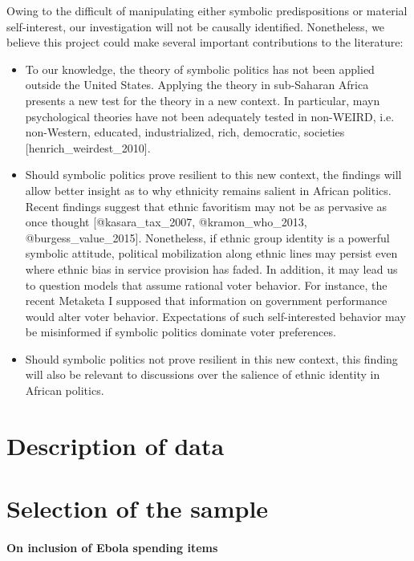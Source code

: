 \documentclass[]{article}
\let\oldparagraph\paragraph
\renewcommand{\paragraph}[1]{\oldparagraph{#1}\mbox{}}
\begin{document}
Owing to the difficult of manipulating either symbolic predispositions
or material self-interest, our investigation will not be causally
identified. Nonetheless, we believe this project could make several
important contributions to the literature:

\begin{itemize}
  \item To our knowledge, the theory of symbolic politics has not been applied outside the United States. Applying the theory in sub-Saharan Africa presents a new test for the theory in a new context. In particular, mayn psychological theories have not been adequately tested in non-WEIRD, i.e. non-Western, educated, industrialized, rich, democratic, societies [henrich_weirdest_2010].
  \item Should symbolic politics prove resilient to this new context, the findings will allow better insight as to why ethnicity remains salient in African politics. Recent findings suggest that ethnic favoritism may not be as pervasive as once thought [@kasara_tax_2007, @kramon_who_2013, @burgess_value_2015]. Nonetheless, if ethnic group identity is a powerful symbolic attitude, political mobilization along ethnic lines may persist even where ethnic bias in service provision has faded. In addition, it may lead us to question models that assume rational voter behavior. For instance, the recent Metaketa I supposed that information on government performance would alter voter behavior. Expectations of such self-interested behavior may be misinformed if symbolic politics dominate voter preferences.
  \item Should symbolic politics not prove resilient in this new context, this finding will also be relevant to discussions over the salience of ethnic identity in African politics.
\end{itemize}

\section{Description of data}\label{description-of-data}

\section{Selection of the sample}\label{selection-of-the-sample}

\paragraph{On inclusion of Ebola spending
items}\label{on-inclusion-of-ebola-spending-items}
\end{document}
